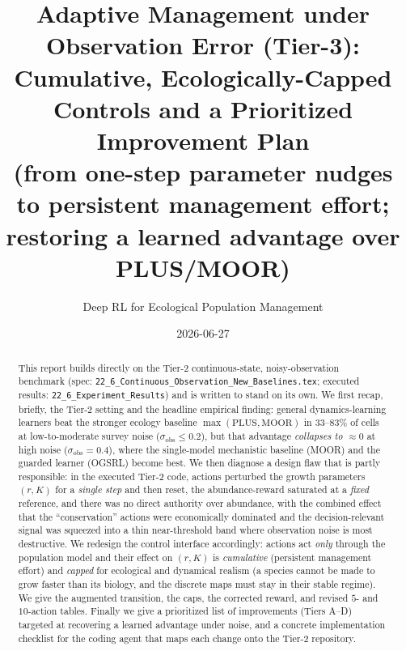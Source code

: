 \documentclass[11pt]{article}
\title{Adaptive Management under Observation Error (Tier-3):\\
Cumulative, Ecologically-Capped Controls and a Prioritized Improvement Plan\\
\large (from one-step parameter nudges to persistent management effort;
restoring a learned advantage over PLUS/MOOR)}
\author{Deep RL for Ecological Population Management}
\date{2026-06-27}
\newcommand{\sobs}{\sigma_{\mathrm{obs}}}
\begin{document}
\maketitle

\begin{abstract}
This report builds directly on the Tier-2 continuous-state, noisy-observation
benchmark (spec: \texttt{22\_6\_Continuous\_Observation\_New\_Baselines.tex};
executed results: \texttt{22\_6\_Experiment\_Results}) and is written to stand on
its own. We first recap, briefly, the Tier-2 setting and the headline empirical
finding: general dynamics-learning learners beat the stronger ecology baseline
$\max(\text{PLUS},\text{MOOR})$ in $33$--$83\%$ of cells at low-to-moderate survey
noise ($\sobs\!\le\!0.2$), but that advantage \emph{collapses to $\approx 0$} at
high noise ($\sobs{=}0.4$), where the single-model mechanistic baseline (MOOR) and
the guarded learner (OGSRL) become best. We then diagnose a design flaw that is
partly responsible: in the executed Tier-2 code, actions perturbed the growth
parameters $(r,K)$ for a \emph{single step} and then reset, the abundance-reward
saturated at a \emph{fixed} reference, and there was no direct authority over
abundance, with the combined effect that the ``conservation'' actions were
economically dominated and the decision-relevant signal was squeezed into a thin
near-threshold band where observation noise is most destructive. We redesign the
control interface accordingly: actions act \emph{only} through the population model
and their effect on $(r,K)$ is \emph{cumulative} (persistent management effort)
and \emph{capped} for ecological and dynamical realism (a species cannot be made
to grow faster than its biology, and the discrete maps must stay in their stable
regime). We give the augmented transition, the caps, the corrected reward, and
revised $5$- and $10$-action tables. Finally we give a prioritized list of
improvements (Tiers A--D) targeted at recovering a learned advantage under noise,
and a concrete implementation checklist for the coding agent that maps each change
onto the Tier-2 repository.
\end{abstract}
\end{document}
